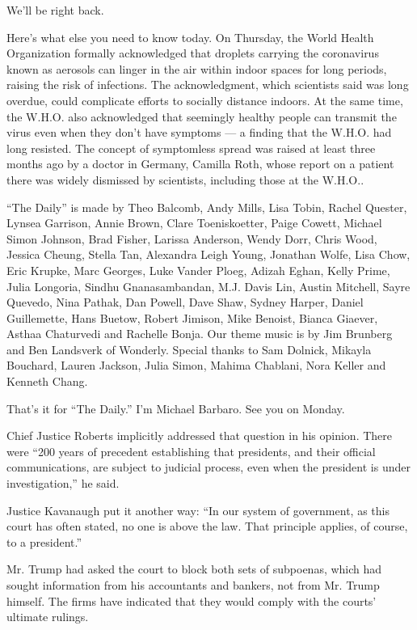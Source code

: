 We'll be right back.

Here's what else you need to know today. On Thursday, the World Health
Organization formally acknowledged that droplets carrying the
coronavirus known as aerosols can linger in the air within indoor spaces
for long periods, raising the risk of infections. The acknowledgment,
which scientists said was long overdue, could complicate efforts to
socially distance indoors. At the same time, the W.H.O. also
acknowledged that seemingly healthy people can transmit the virus even
when they don't have symptoms --- a finding that the W.H.O. had long
resisted. The concept of symptomless spread was raised at least three
months ago by a doctor in Germany, Camilla Roth, whose report on a
patient there was widely dismissed by scientists, including those at the
W.H.O..

``The Daily'' is made by Theo Balcomb, Andy Mills, Lisa Tobin, Rachel
Quester, Lynsea Garrison, Annie Brown, Clare Toeniskoetter, Paige
Cowett, Michael Simon Johnson, Brad Fisher, Larissa Anderson, Wendy
Dorr, Chris Wood, Jessica Cheung, Stella Tan, Alexandra Leigh Young,
Jonathan Wolfe, Lisa Chow, Eric Krupke, Marc Georges, Luke Vander Ploeg,
Adizah Eghan, Kelly Prime, Julia Longoria, Sindhu Gnanasambandan, M.J.
Davis Lin, Austin Mitchell, Sayre Quevedo, Nina Pathak, Dan Powell, Dave
Shaw, Sydney Harper, Daniel Guillemette, Hans Buetow, Robert Jimison,
Mike Benoist, Bianca Giaever, Asthaa Chaturvedi and Rachelle Bonja. Our
theme music is by Jim Brunberg and Ben Landsverk of Wonderly. Special
thanks to Sam Dolnick, Mikayla Bouchard, Lauren Jackson, Julia Simon,
Mahima Chablani, Nora Keller and Kenneth Chang.

That's it for ``The Daily.'' I'm Michael Barbaro. See you on Monday.

Chief Justice Roberts implicitly addressed that question in his opinion.
There were ``200 years of precedent establishing that presidents, and
their official communications, are subject to judicial process, even
when the president is under investigation,'' he said.

Justice Kavanaugh put it another way: ``In our system of government, as
this court has often stated, no one is above the law. That principle
applies, of course, to a president.''

Mr. Trump had asked the court to block both sets of subpoenas, which had
sought information from his accountants and bankers, not from Mr. Trump
himself. The firms have indicated that they would comply with the
courts' ultimate rulings.


